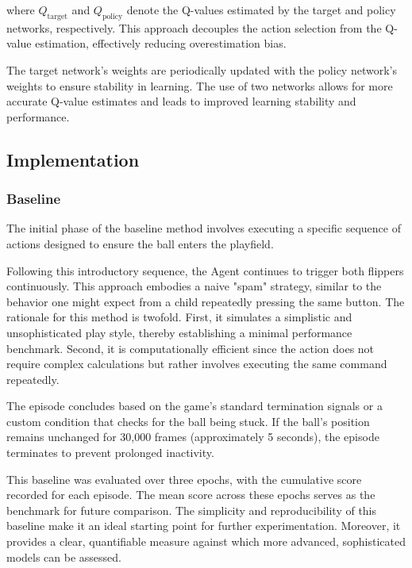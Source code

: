 where $Q_{\text{target}}$ and $Q_{\text{policy}}$ denote the Q-values estimated by the target and policy networks, respectively. This approach decouples the action selection from the Q-value estimation, effectively reducing overestimation bias.

The target network's weights are periodically updated with the policy network's weights to ensure stability in learning. The use of two networks allows for more accurate Q-value estimates and leads to improved learning stability and performance.

\subsection{Implementation}
\subsubsection{Baseline}

The initial phase of the baseline method involves executing a specific sequence of actions designed to ensure the ball enters the playfield.

Following this introductory sequence, the Agent continues to trigger both flippers continuously. This approach embodies a naive "spam" strategy, similar to the behavior one might expect from a child repeatedly pressing the same button. The rationale for this method is twofold. First, it simulates a simplistic and unsophisticated play style, thereby establishing a minimal performance benchmark. Second, it is computationally efficient since the action does not require complex calculations but rather involves executing the same command repeatedly.

The episode concludes based on the game’s standard termination signals or a custom condition that checks for the ball being stuck. If the ball's position remains unchanged for 30,000 frames (approximately 5 seconds), the episode terminates to prevent prolonged inactivity.

This baseline was evaluated over three epochs, with the cumulative score recorded for each episode. The mean score across these epochs serves as the benchmark for future comparison. The simplicity and reproducibility of this baseline make it an ideal starting point for further experimentation. Moreover, it provides a clear, quantifiable measure against which more advanced, sophisticated models can be assessed.

